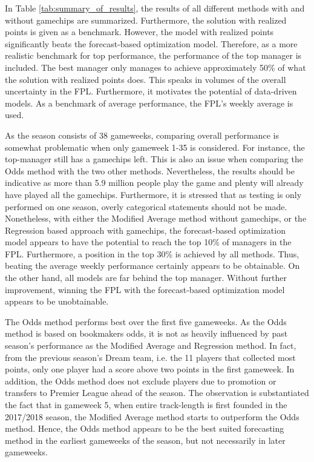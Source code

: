 In Table \ref{tab:summary_of_results}, the results of all different methods with and without gamechips are summarized. Furthermore, the solution with realized points is given as a benchmark. However, the model with realized points significantly beats the forecast-based optimization model. Therefore, as a more realistic benchmark for top performance, the performance of the top manager is included. The best manager only manages to achieve approximately 50\% of what the solution with realized points does. This speaks in volumes of the overall uncertainty in the FPL. Furthermore, it motivates the potential of data-driven models. As a benchmark of average performance, the FPL's weekly average is used.

\newpar

As the season consists of 38 gameweeks, comparing overall performance is somewhat problematic when only gameweek 1-35 is considered. For instance, the top-manager still has a gamechips left. This is also an issue when comparing the Odds method with the two other methods. Nevertheless, the results should be indicative as more than 5.9 million people play the game and plenty will already have played all the gamechips. Furthermore, it is  stressed that as testing is only performed on one season, overly categorical statements should not be made. Nonetheless, with either the Modified Average method without gamechips, or the Regression based approach with gamechips, the forecast-based optimization model appears to have the potential to reach the top 10\% of managers in the FPL. Furthermore, a position in the top 30\% is achieved by all methods. Thus, beating the average weekly performance certainly appears to be obtainable. On the other hand, all models are far behind the top manager. Without further improvement, winning the FPL with the forecast-based optimization model appears to be unobtainable. 

\newpar

The Odds method performs best over the first five gameweeks. As the Odds method is based on bookmakers odds, it is not as heavily influenced by past season's performance as the Modified Average and Regression method. In fact, from the previous season's Dream team, i.e. the 11 players that collected most points, only one player had a score above two points in the first gameweek. In addition, the Odds method does not exclude players due to promotion or transfers to Premier League ahead of the season. The observation is substantiated the fact that in gameweek 5, when entire track-length is first founded in the 2017/2018 season, the Modified Average method starts to outperform the Odds method. Hence, the Odds method appears to be the best suited forecasting method in the earliest gameweeks of the season, but not necessarily in later gameweeks.

